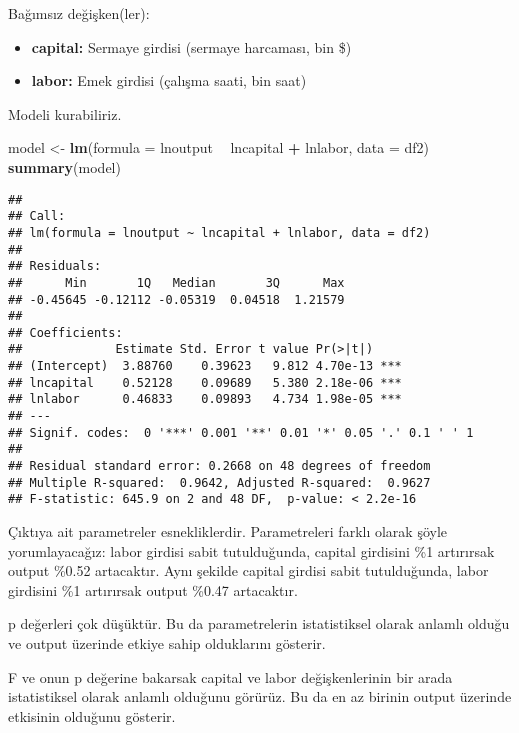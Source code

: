 \documentclass[
]{book}
\newenvironment{Shaded}{\begin{snugshade}}{\end{snugshade}}
\newcommand{\DataTypeTok}[1]{\textcolor[rgb]{0.13,0.29,0.53}{#1}}
\newcommand{\KeywordTok}[1]{\textcolor[rgb]{0.13,0.29,0.53}{\textbf{#1}}}
\newcommand{\NormalTok}[1]{#1}
\newcommand{\OperatorTok}[1]{\textcolor[rgb]{0.81,0.36,0.00}{\textbf{#1}}}
\newcommand{\StringTok}[1]{\textcolor[rgb]{0.31,0.60,0.02}{#1}}
\begin{document}
Bağımsız değişken(ler):

\begin{itemize}
\item
  \textbf{capital:} Sermaye girdisi (sermaye harcaması, bin \$)
\item
  \textbf{labor:} Emek girdisi (çalışma saati, bin saat)
\end{itemize}

Modeli kurabiliriz.

\begin{Shaded}
\begin{Highlighting}[]
\NormalTok{model <-}\StringTok{ }\KeywordTok{lm}\NormalTok{(}\DataTypeTok{formula =}\NormalTok{ lnoutput }\OperatorTok{~}\StringTok{ }\NormalTok{lncapital }\OperatorTok{+}\StringTok{ }\NormalTok{lnlabor, }\DataTypeTok{data =}\NormalTok{ df2)}
\KeywordTok{summary}\NormalTok{(model)}
\end{Highlighting}
\end{Shaded}

\begin{verbatim}
## 
## Call:
## lm(formula = lnoutput ~ lncapital + lnlabor, data = df2)
## 
## Residuals:
##      Min       1Q   Median       3Q      Max 
## -0.45645 -0.12112 -0.05319  0.04518  1.21579 
## 
## Coefficients:
##             Estimate Std. Error t value Pr(>|t|)    
## (Intercept)  3.88760    0.39623   9.812 4.70e-13 ***
## lncapital    0.52128    0.09689   5.380 2.18e-06 ***
## lnlabor      0.46833    0.09893   4.734 1.98e-05 ***
## ---
## Signif. codes:  0 '***' 0.001 '**' 0.01 '*' 0.05 '.' 0.1 ' ' 1
## 
## Residual standard error: 0.2668 on 48 degrees of freedom
## Multiple R-squared:  0.9642, Adjusted R-squared:  0.9627 
## F-statistic: 645.9 on 2 and 48 DF,  p-value: < 2.2e-16
\end{verbatim}

Çıktıya ait parametreler esnekliklerdir. Parametreleri farklı olarak şöyle yorumlayacağız: labor girdisi sabit tutulduğunda, capital girdisini \%1 artırırsak output \%0.52 artacaktır. Aynı şekilde capital girdisi sabit tutulduğunda, labor girdisini \%1 artırırsak output \%0.47 artacaktır.

p değerleri çok düşüktür. Bu da parametrelerin istatistiksel olarak anlamlı olduğu ve output üzerinde etkiye sahip olduklarını gösterir.

F ve onun p değerine bakarsak capital ve labor değişkenlerinin bir arada istatistiksel olarak anlamlı olduğunu görürüz. Bu da en az birinin output üzerinde etkisinin olduğunu gösterir.
\end{document}

